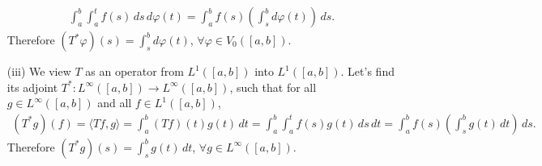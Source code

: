\documentclass{article}
\begin{document}
\begin{itemize}
\begin{align*}
	\int_a^b\int_a^t f(s)\,ds\,d\varphi(t) = \int_a^b f(s)\left(\int_s^b d\varphi(t)\right)\,ds.
\end{align*}
Therefore $(T^*\varphi)(s) = \int_s^b d\varphi(t)$, $\forall \varphi\in V_0([a,b])$.
\vspace{0.1cm}
\item[(iii)] We view $T$ as an operator from $L^1([a,b])$ into $L^1([a,b])$. Let's find its adjoint $T^*:L^\infty([a,b])\to L^\infty([a,b])$, such that for all $g\in L^\infty([a,b])$ and all $f\in L^1([a,b])$,
\begin{align*}
	(T^*g)(f) = \langle Tf,g\rangle = \int_a^b(Tf)(t)g(t)\,dt = \int_a^b\int_a^t f(s)g(t)\,ds\,dt = \int_a^b f(s)\left(\int_s^b g(t)\,dt\right)\,ds.
\end{align*}
Therefore $(T^*g)(s) = \int_s^b g(t)\,dt$, $\forall g\in L^\infty([a,b])$.
\end{itemize}
\end{document}
